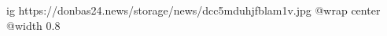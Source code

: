  
 
 
 
 

\ifcmt
  ig https://donbas24.news/storage/news/dcc5mduhjfblam1v.jpg
  @wrap center
  @width 0.8
\fi
